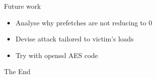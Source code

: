 \documentclass[10pt]{beamer}
\begin{document}
\begin{frame}{Future work}
    \begin{itemize}
        \item Analyse why prefetches are not reducing to 0
        \item Devise attack tailored to victim's loads
        \item Try with openssl AES code
    \end{itemize}
\end{frame}

\begin{frame}
    \Huge{\centerline{The End}}
\end{frame}
\end{document}
